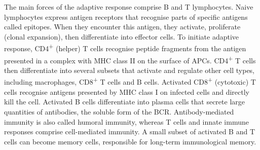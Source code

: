 \begin{outline}
The main forces of the adaptive response comprise B and T lymphocytes.
Naive lymphocytes express antigen receptors that recognise parts of specific antigens called epitopes.
When they encounter this antigen, they activate, proliferate (clonal expansion), then differentiate into effector cells.
To initiate adaptive response,
CD4\textsuperscript{+} (helper) T cells recognise peptide fragments from the antigen presented in a complex with \gls{MHC} class II on the surface of \glspl{APC}.
CD4\textsuperscript{+} T cells then differentiate into several subsets that activate and regulate other cell types, including macrophages, CD8\textsuperscript{+} T cells and B cells.
Activated CD8\textsuperscript{+} (cytotoxic) T cells recognise antigens presented by \gls{MHC} class I on infected cells and directly kill the cell.
Activated B cells differentiate into plasma cells that secrete large quantities of antibodies, the soluble form of the \gls{BCR}.
Antibody-mediated immunity is also called humoral immunity,
whereas T cells and innate immune responses comprise cell-mediated immunity.
A small subset of activated B and T cells can become memory cells, responsible for long-term immunological memory.


\end{outline}

